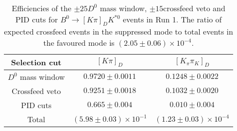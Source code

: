 \begin{table}
    \centering
    \begin{tabular}{ccc}
        \toprule
Selection cut & $[K \pi]_D$ & $[K_\pi \pi_K]_D$ \\
        \midrule
$D^0$ mass window & $0.9720 \pm 0.0011$ & $0.1248 \pm 0.0022$ \\
Crossfeed veto & $0.9251 \pm 0.0018$ & $0.1032 \pm 0.0020$ \\
PID cuts & $0.665 \pm 0.004$ & $0.010 \pm 0.004$\\
        \midrule
Total & $(5.98 \pm 0.03) \times 10^{-1}$ & $(1.23 \pm 0.03) \times 10^{-4}$\\
        \bottomrule
    \end{tabular}
    \caption{Efficiencies of the $\pm 25$\mev $D^0$ mass window, $\pm 15$\mev crossfeed veto and PID cuts for $B^0 \to [K\pi]_D K^{*0}$ events in Run 1. The ratio of expected crossfeed events in the suppressed mode to total events in the favoured mode is $(2.05 \pm 0.06) \times 10^{-4}$.}
\label{tab:double_misID_eff_Kpi_run1}
\end{table}
